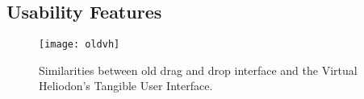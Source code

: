 
	\subsection{Usability Features}

		\begin{figure}[h]
		\centering
		\texttt{[image: oldvh]}
		\caption{
		Similarities between old drag and drop interface and the Virtual Heliodon's Tangible User Interface. 
		}
		\label{fig:oldvh}
		\end{figure}


